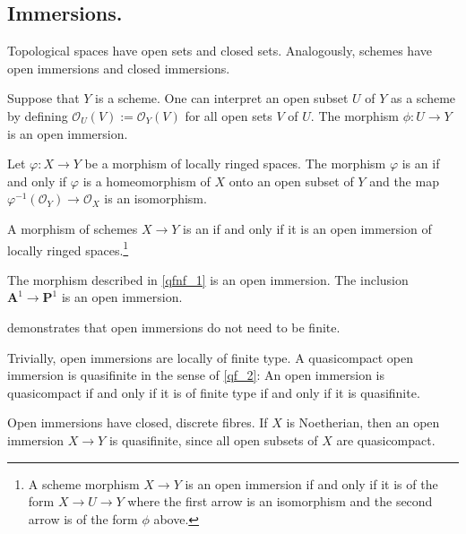\documentclass [11 pt, oneside] {article}
\begin{document}
\subsection{Immersions.}
Topological spaces have open sets and closed sets. Analogously, schemes have open immersions and closed immersions. 

Suppose that $Y$ is a scheme. One can interpret an open subset $U$ of $Y$ as a scheme by defining $\mathscr{O}_U (V):=\mathscr{O}_Y(V)$ for all open sets $V$ of $U$. The morphism $\phi : U\longrightarrow Y$ is an open immersion.

\begin{definition}[ ]\label{}\text{}
Let $\varphi:X\longrightarrow Y$ be a morphism of locally ringed spaces. The morphism $\varphi$ is an  if and only if $\varphi$ is a homeomorphism of $X$ onto an open subset of $Y$ and the map $\varphi^{-1}(\mathscr{O}_Y)\longrightarrow \mathscr{O}_X$ is an isomorphism.
\end{definition}

A morphism of schemes $X\longrightarrow Y$ is an  if and only if it is an open immersion of locally ringed spaces.\footnote{A scheme morphism $X\longrightarrow Y$ is an open immersion if and only if it is of the form $X\longrightarrow U\longrightarrow Y$ where the first arrow is an isomorphism and the second arrow is of the form $\phi$ above.}

\begin{example}[ ]\label{op_im_ex}\text{}
The morphism described in \cref{qfnf_1} is an open immersion. The inclusion $\mathbf{A}^1 \longrightarrow \mathbf{P}^1$ is an open immersion.
\end{example}

\begin{remark}
	 demonstrates that open immersions do not need to be finite. 
\end{remark}

\begin{remark}
	Trivially, open immersions are locally of finite type. A quasicompact open immersion is quasifinite in the sense of \cref{qf_2}: An open immersion is quasicompact if and only if it is of finite type if and only if it is quasifinite.
\end{remark}

\begin{remark}
	Open immersions have closed, discrete fibres. If $X$ is Noetherian, then an open immersion $X\longrightarrow Y$ is quasifinite, since all open subsets of $X$ are quasicompact.
\end{remark}
\end{document}
